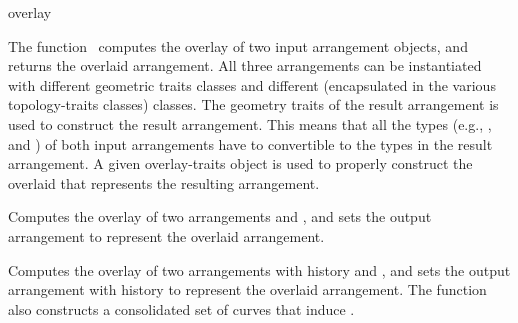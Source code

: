 \ccRefPageBegin

\begin{ccRefFunction}{overlay}

\ccDefinition

The function \ccRefName\ computes the overlay of two input arrangement
objects, and returns the overlaid arrangement. 
All three arrangements can be instantiated with different geometric
traits classes and different \dcel{} (encapsulated in the various
topology-traits classes)  classes.
The geometry traits of the result arrangement is 
used to construct the result arrangement. This means that all
the types (e.g., ,  and
) of both input arrangements have to convertible
to the types in the result arrangement.
A given overlay-traits object is used to properly construct the
overlaid \dcel{} that represents the resulting arrangement.



Computes the overlay of two arrangements  and , and sets
the output arrangement  to represent the overlaid arrangement.




Computes the overlay of two arrangements with history  and
, and sets the output arrangement with history  to
represent the overlaid arrangement. The function also constructs a
consolidated set of curves that induce .


\end{ccRefFunction}
